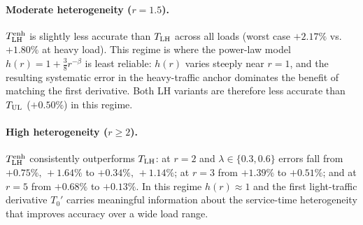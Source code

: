 \paragraph{Moderate heterogeneity ($r = 1.5$).}
$T_{\text{LH}}^{\text{enh}}$ is slightly less accurate than $T_{\text{LH}}$ across all loads
(worst case $+2.17\%$ vs.\ $+1.80\%$ at heavy load).
This regime is where the power-law model $h(r) = 1 + \tfrac{3}{8}r^{-\beta}$
is least reliable: $h(r)$ varies steeply near $r = 1$, and the resulting
systematic error in the heavy-traffic anchor dominates the benefit of
matching the first derivative.
Both LH variants are therefore less accurate than $T_{\text{UL}}$ ($+0.50\%$) in
this regime.

\paragraph{High heterogeneity ($r \geq 2$).}
$T_{\text{LH}}^{\text{enh}}$ consistently outperforms $T_{\text{LH}}$:
at $r = 2$ and $\lambda \in \{0.3, 0.6\}$ errors fall from $+0.75\%,\,+1.64\%$
to $+0.34\%,\,+1.14\%$; at $r = 3$ from $+1.39\%$ to $+0.51\%$;
and at $r = 5$ from $+0.68\%$ to $+0.13\%$.
In this regime $h(r) \approx 1$ and the first light-traffic derivative
$T_0'$ carries meaningful information about the service-time
heterogeneity that improves accuracy over a wide load range.
